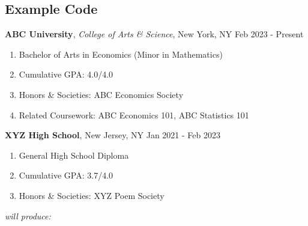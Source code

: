 \documentclass[a4paper, 10pt]{article}
\begin{document}
\subsection{Example Code}
\begin{codebox}[title = Resume Section Example Code]
    \begin{ressection}[title = Education]
        {\bf ABC University}, {\sl College of Arts \& Science}, New York, NY
        \hfill
        Feb 2023 - Present

        \begin{enumerate}
            \item Bachelor of Arts in Economics (Minor in Mathematics)
            \item Cumulative GPA: 4.0/4.0
            \item Honors \& Societies: ABC Economics Society
            \item Related Coursework: ABC Economics 101, ABC Statistics 101
        \end{enumerate}

        \ressep

        {\bf XYZ High School}, New Jersey, NY
        \hfill
        Jan 2021 - Feb 2023

        \begin{enumerate}
            \item General High School Diploma
            \item Cumulative GPA: 3.7/4.0
            \item Honors \& Societies: XYZ Poem Society
        \end{enumerate}
    \end{ressection}
\end{codebox}

\vspace{1cm}

{\it will produce:}

\vspace{1cm}
\end{document}
